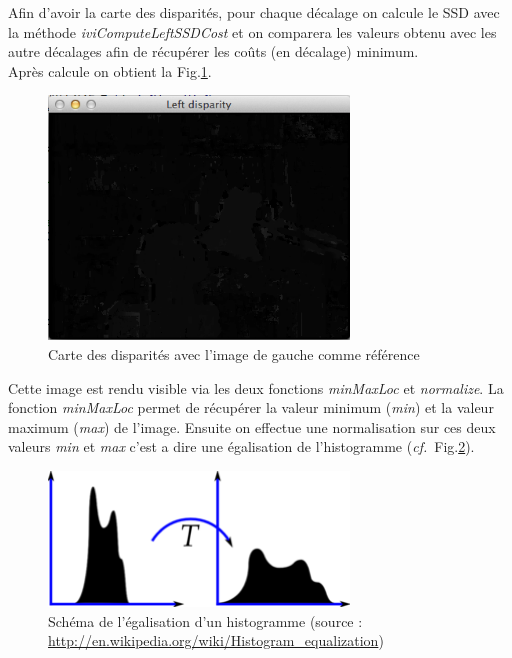 \documentclass[a4paper,10pt]{article}
\begin{document}
Afin d'avoir la carte des disparit\'es, pour chaque d\'ecalage on calcule le SSD avec la m\'ethode \emph{iviComputeLeftSSDCost} et on comparera les valeurs obtenu avec les autre d\'ecalages afin de r\'ecup\'erer les co\^uts (en d\'ecalage) minimum. \\

Apr\`es calcule on obtient la Fig.\ref{disparite_img_g}. \\

\begin{figure}[ht]
\begin{center}
	\includegraphics[width=8cm]{images/disparite_img_g.png}
\end{center}
	\caption{Carte des disparit\'es avec l'image de gauche comme r\'ef\'erence}
	\label{disparite_img_g}
\end{figure}

\newpage

Cette image est rendu visible via les deux fonctions  \emph{minMaxLoc} et \emph{normalize}. La fonction \emph{minMaxLoc} permet de r\'ecup\'erer la valeur minimum (\emph{min}) et la valeur maximum (\emph{max}) de l'image. Ensuite on effectue une normalisation sur ces deux valeurs \emph{min} et \emph{max} c'est a dire une \'egalisation de l'histogramme (\emph{cf.}~Fig.\ref{histo}).

\begin{figure}[ht]
\begin{center}
	\includegraphics[width=8cm]{images/histo.png}
\end{center}
	\caption{Sch\'ema de l'\'egalisation d'un histogramme (source : \url{http://en.wikipedia.org/wiki/Histogram_equalization})}
	\label{histo}
\end{figure}
\end{document}
